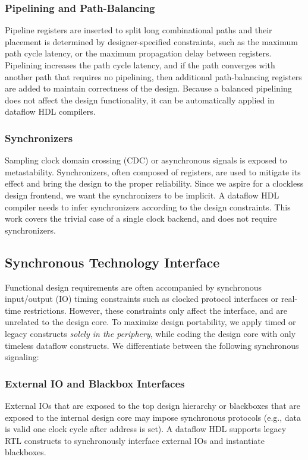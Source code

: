 \subsubsection{Pipelining and Path-Balancing}
Pipeline registers are inserted to split long combinational paths and their placement is determined by designer-specified constraints, such as the maximum path cycle latency, or the maximum propagation delay between registers. Pipelining increases the path cycle latency, and if the path converges with another path that requires no pipelining, then additional path-balancing registers are added to maintain correctness of the design. Because a balanced pipelining does not affect the design functionality, it can be automatically applied in dataflow HDL compilers.   
\subsubsection{Synchronizers}
Sampling clock domain crossing (CDC) or asynchronous signals is exposed to metastability. Synchronizers, often composed of registers, are used to mitigate its effect and bring the design to the proper reliability. Since we aspire for a clockless design frontend, we want the synchronizers to be implicit. A dataflow HDL compiler needs to infer synchronizers according to the design constraints. This work covers the trivial case of a single clock backend, and does not require synchronizers.

\subsection{Synchronous Technology Interface}
Functional design requirements are often accompanied by synchronous input/output (IO) timing constraints such as clocked protocol interfaces or real-time restrictions. However, these constraints only affect the interface, and are unrelated to the design core. To maximize design portability, we apply timed or legacy constructs \emph{solely in the periphery}, while coding the design core with only timeless dataflow constructs. We differentiate between the following synchronous signaling:
\subsubsection{External IO and Blackbox Interfaces}
External IOs that are exposed to the top design hierarchy or blackboxes that are exposed to the internal design core may impose synchronous protocols (e.g., data is valid one clock cycle after address is set). A dataflow HDL supports legacy RTL constructs to synchronously interface external IOs and instantiate blackboxes. 
